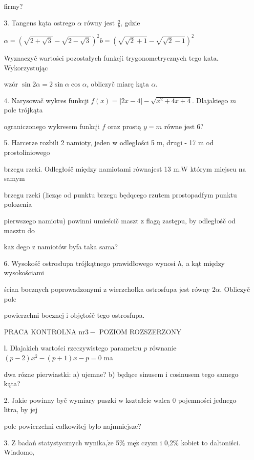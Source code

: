 \documentclass[a4paper,12pt]{article}
\begin{document}
firmy?

3. Tangens kąta ostrego $\alpha$ równy jest $\displaystyle \frac{a}{b}$, gdzie

$\alpha=(\sqrt{2+\sqrt{3}}-\sqrt{2-\sqrt{3}})^{2}b=(\sqrt{\sqrt{2}+1}-\sqrt{\sqrt{2}-1})^{2}$

Wyznaczyč wartości pozostałych funkcji trygonometrycznych tego kata. Wykorzystując

wzór $\sin 2\alpha=2\sin\alpha\cos\alpha$, obliczyč miarę kąta $\alpha.$

4. Narysowač wykres funkcji $f(x)=|2x-4|-\sqrt{x^{2}+4x+4}$. Dlajakiego $m$ pole trójkąta

ograniczonego wykresem funkcji $f$ oraz prostą $y=m$ równe jest 6?

5. Harcerze rozbili 2 namioty, jeden $\mathrm{w}$ odległości 5 $\mathrm{m}$, drugi - 17 $\mathrm{m}$ od prostoliniowego

brzegu rzeki. Odległośč między namiotami równajest 13 $\mathrm{m}. \mathrm{W}$ którym miejscu $\mathrm{n}\mathrm{a}$ samym

brzegu rzeki (licząc od punktu brzegu będqcego rzutem prostopadfym punktu polozenia

pierwszego namiotu) powinni umieścič maszt $\mathrm{z}$ flagą zastępu, by odległośč od masztu do

$\mathrm{k}\mathrm{a}\dot{\mathrm{z}}$ dego $\mathrm{z}$ namiotów byfa taka sama?

6. Wysokośč ostrosłupa trójkątnego prawidłowego wynosi $h$, a kąt między wysokościami

ścian bocznych poprowadzonymi $\mathrm{z}$ wierzchołka ostrosfupa jest równy $ 2\alpha$. Obliczyč pole

powierzchni bocznej $\mathrm{i}$ objętośč tego ostrosfupa.





PRACA KONTROLNA $\mathrm{n}\mathrm{r}3-$ POZIOM ROZSZERZONY

l. Dlajakich wartości rzeczywistego parametru $p$ równanie $(p-2)x^{2}-(p+1)x-p=0$ ma

dwa rózne pierwiastki: a) ujemne? b) będące sinusem $\mathrm{i}$ cosinusem tego samego kąta?

2. Jakie powinny byč wymiary puszki $\mathrm{w}$ kształcie walca $0$ pojemności jednego litra, by jej

pole powierzchni całkowitej bylo najmniejsze?

3. $\mathrm{Z}$ badań statystycznych wynika,$\dot{\mathrm{z}}\mathrm{e}$ 5\% $\mathrm{m}\text{ę}\dot{\mathrm{z}}$ czyzn $\mathrm{i}$ 0,2\% kobiet to daltoniści. Wiadomo,
\end{document}
